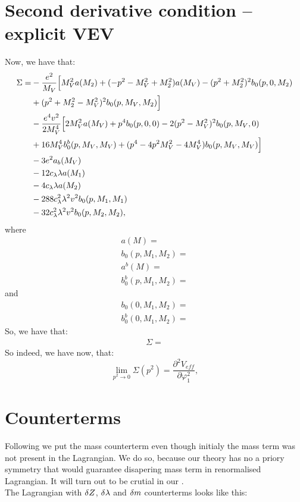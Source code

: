 \section{Second derivative condition -- explicit VEV}\label{sdcworks}
Now, we have that:
\begin{align}
\Sigma = &-\frac{e^2}{M_V}\Big[M_V^2a(M_2)+(-p^2-M_V^2+M_2^2)a(M_V)-(p^2+M_2^2)^2b_0(p,0,M_2) 
\notag\\ 
&+(p^2+M_2^2-M_V^2)^2b_0(p,M_V,M_2)\Big] \notag \\
&-\frac{e^4v^2}{2M_V^4}\Big[2M_V^2a(M_V)+p^4b_0(p,0,0)-2(p^2-M_V^2)^2b_0(p,M_V,0)\notag \\
&+16M_V^4b_0^b(p,M_V,M_V)+(p^4-4p^2M_V^2-4M_V^4)b_0(p,M_V,M_V)\Big] \notag \\
&-3e^2a_b(M_V) \notag\\
&-12c_\lambda\lambda a(M_1)\notag \\
&-4c_\lambda\lambda a(M_2)\notag \\
&-288c_\lambda^2\lambda^2v^2b_0(p,M_1,M_1)\notag \\
&-32c_\lambda^2\lambda^2 v^2b_0(p,M_2,M_2),
\end{align}
where
\begin{align}
a(M) = \\
b_0(p,M_1,M_2) = \\
a^b(M) = \\
b_0^b(p,M_1,M_2) = 
\end{align}
and
\begin{align}
b_0(0,M_1,M_2) = \\
b_0^b(0,M_1,M_2) = 
\end{align}
So, we have that:
\begin{align}
\Sigma = 
\end{align}
So indeed, we have now, that:
\begin{equation}\label{second_derivativ_condition}
\lim\limits_{p^2\to 0}\Sigma(p^2)=\frac{\partial^2V_{eff}}{\partial\varphi_1^2},
\end{equation}
\section{Counterterms}
Following \cite{Coleman1973} we put the mass counterterm even though initialy the mass term 
was not present in the Lagrangian. We do so, because our theory has no a priory symmetry 
that would guarantee disapering mass term in renormalised Lagrangian. It will turn out to be 
crutial in our . \\ 
The Lagrangian with $\delta Z$, $\delta\lambda$ and $\delta m$ counterterms looks like this:

